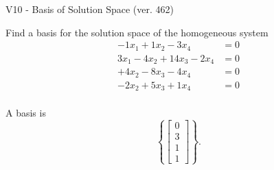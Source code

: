 \begin{exercise}
  \begin{exerciseTitle}V10 - Basis of Solution Space (ver. 462)\end{exerciseTitle}
  \begin{exerciseStatement}
    Find a basis for the solution space of the homogeneous system 
\begin{align*}
 -1 x_ 1 + 1 x_ 2 -3 x_ 4 &= 0  \\ 
  3 x_ 1 -4 x_ 2 + 14 x_ 3 -2 x_ 4 &= 0  \\ 
  + 4 x_ 2 -8 x_ 3 -4 x_ 4 &= 0  \\ 
  -2 x_ 2 + 5 x_ 3 + 1 x_ 4 &= 0  \\ 
 \end{align*}


 
  \end{exerciseStatement}

  \begin{exerciseAnswer}
   A basis is   
\[\left\{\left[\begin{array}{c}
0 \\
3 \\
1 \\
1
\end{array}\right]\right\}.\]

  


  \end{exerciseAnswer}
\end{exercise}